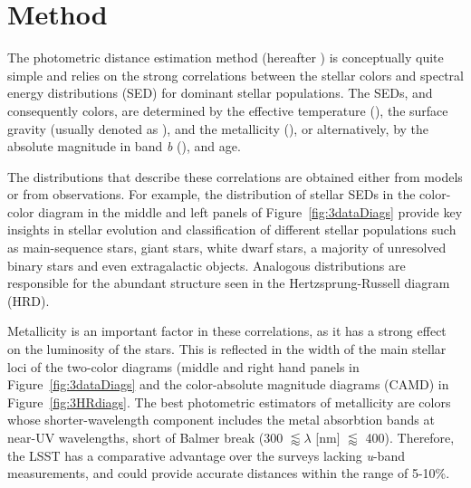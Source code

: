 
\section{Method} \label{sec:method}

The photometric distance estimation method (hereafter \pd) is conceptually quite simple and relies on the strong correlations between the stellar colors and spectral energy distributions (SED) for dominant stellar populations. The SEDs, and consequently colors, are determined by the effective temperature (\teff), the surface gravity (usually denoted as \logg), and the metallicity (\mh), or alternatively, by the absolute magnitude in band \textit{b} (\Mb), \mh and age.

The distributions that describe these correlations are obtained either from models or from observations. For example, the distribution of stellar SEDs in the color-color diagram in the middle and left panels of Figure~\ref{fig:3dataDiags} provide key insights in stellar evolution and classification of different stellar populations such as main-sequence stars, giant stars, white dwarf stars, a majority of unresolved binary stars and even extragalactic objects. Analogous distributions are responsible for the abundant structure seen in the Hertzsprung-Russell diagram (HRD).

\begin{figure*}[ht!]
	\caption{The blue dots in the left panel show color-magnitude diagram for 841,000 stars from the SDSS Stripe 82 Standard Star Catalog that have Gaia matches within 0.15 arcsec (after correcting for proper motion using Gaia measurements). A subset	of 415,000 stars with $r < 22$ and $u<22$ are shown as red dots, and 409,000 of those that also have $0.2 < g-i < 3.5$ are shown as cyan dots. Finally, 63,000 stars that have signal-to-noise ratio for Gaia’s parallax measurements of at least 20 are shown as green dots. The same color scheme is used in other two panels. The three yellow lines in the middle panel show stellar locus parametrization used by Green et al. (2014) for three values of metallicity (left to right): $[Fe/H] = -2.0, -1.0, 0.0$. In the right panel, the impact of metallicity on color-color tracks is negligible and all three are indistinguishable from each other. } \label{fig:3dataDiags}
\end{figure*}

Metallicity is an important factor in these correlations, as it has a strong effect on the luminosity of the stars. This is reflected in the width of the main stellar loci of the two-color diagrams (middle and right hand panels in Figure~\ref{fig:3dataDiags} and the color-absolute magnitude diagrams (CAMD) in Figure~\ref{fig:3HRdiags}. The best photometric estimators of metallicity are colors whose shorter-wavelength component includes the metal absorbtion bands at near-UV wavelengths, short of Balmer break (300 $\lessapprox\lambda$ [nm] $\lessapprox$ 400). Therefore, the LSST has a comparative advantage over the surveys lacking \textit{u}-band measurements, and could provide accurate distances within the range of 5-10\%. 

